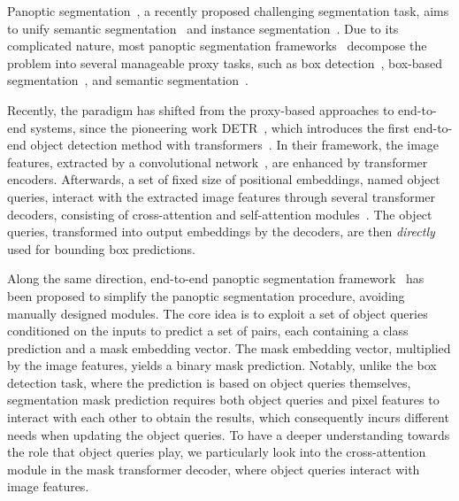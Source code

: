 \documentclass[10pt,twocolumn,letterpaper]{article}
\begin{document}
Panoptic segmentation~\cite{kirillov2019panoptic}, a recently proposed challenging segmentation task, aims to unify semantic segmentation~\cite{he2004multiscale} and instance segmentation~\cite{hariharan2014simultaneous}. Due to its complicated nature, most panoptic segmentation frameworks~\cite{kirillov2019panoptic,xiong2019upsnet,cheng2019panopticworkshop} decompose the problem into several manageable proxy tasks, such as box detection~\cite{ren2015faster}, box-based segmentation~\cite{he2017mask}, and semantic segmentation~\cite{long2014fully}.

Recently, the paradigm has shifted from the proxy-based approaches to end-to-end systems, since the pioneering work DETR~\cite{carion2020end}, which introduces the first end-to-end object detection method with transformers~\cite{vaswani2017attention}. In their framework, the image features, extracted by a convolutional network~\cite{lecun1998gradient}, are enhanced by transformer encoders. Afterwards, a set of fixed size of positional embeddings, named object queries, interact with the extracted image features through several transformer decoders, consisting of cross-attention and self-attention modules~\cite{bahdanau2014neural}. The object queries, transformed into output embeddings by the decoders, are then {\it directly} used for bounding box predictions.

Along the same direction, end-to-end panoptic segmentation framework~\cite{wang2021max} has been proposed to simplify the panoptic segmentation procedure, avoiding manually designed modules.
The core idea is to exploit a set of object queries conditioned on the inputs to predict a set of pairs, each containing a class prediction and a mask embedding vector. The mask embedding vector, multiplied by the image features, yields a binary mask prediction.
Notably, unlike the box detection task, where the prediction is based on object queries themselves, segmentation mask prediction requires both object queries and pixel features to interact with each other to obtain the results, which consequently incurs different needs when updating the object queries.
To have a deeper understanding towards the role that object queries play, we particularly look into the cross-attention module in the mask transformer decoder, where object queries interact with image features.
\end{document}
